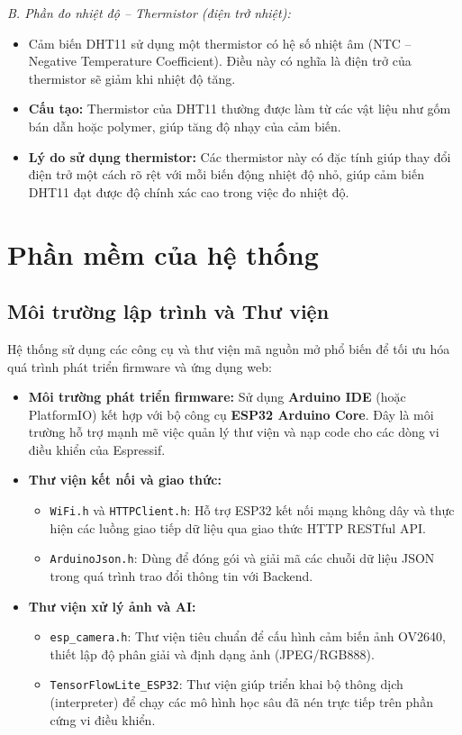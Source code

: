 \documentclass[12pt,a4paper]{report}
\begin{document}
\textit{B. Phần đo nhiệt độ -- Thermistor (điện trở nhiệt):}
\begin{itemize}
    \item Cảm biến DHT11 sử dụng một thermistor có hệ số nhiệt âm (NTC --
    Negative Temperature Coefficient). Điều này có nghĩa là điện trở của
    thermistor sẽ giảm khi nhiệt độ tăng.
    \item \textbf{Cấu tạo:} Thermistor của DHT11 thường được làm từ các vật liệu
    như gốm bán dẫn hoặc polymer, giúp tăng độ nhạy của cảm biến.
    \item \textbf{Lý do sử dụng thermistor:} Các thermistor này có đặc tính giúp
    thay đổi điện trở một cách rõ rệt với mỗi biến động nhiệt độ nhỏ, giúp cảm
    biến DHT11 đạt được độ chính xác cao trong việc đo nhiệt độ.
\end{itemize}

\section{Phần mềm của hệ thống}

\subsection{Môi trường lập trình và Thư viện}

Hệ thống sử dụng các công cụ và thư viện mã nguồn mở phổ biến để tối ưu hóa quá trình phát triển firmware và ứng dụng web:

\begin{itemize}
    \item \textbf{Môi trường phát triển firmware:} Sử dụng \textbf{Arduino IDE} (hoặc PlatformIO) kết hợp với bộ công cụ \textbf{ESP32 Arduino Core}. Đây là môi trường hỗ trợ mạnh mẽ việc quản lý thư viện và nạp code cho các dòng vi điều khiển của Espressif.
    \item \textbf{Thư viện kết nối và giao thức:}
    \begin{itemize}
        \item \texttt{WiFi.h} và \texttt{HTTPClient.h}: Hỗ trợ ESP32 kết nối mạng không dây và thực hiện các luồng giao tiếp dữ liệu qua giao thức HTTP RESTful API.
        \item \texttt{ArduinoJson.h}: Dùng để đóng gói và giải mã các chuỗi dữ liệu JSON trong quá trình trao đổi thông tin với Backend.
    \end{itemize}
    \item \textbf{Thư viện xử lý ảnh và AI:}
    \begin{itemize}
        \item \texttt{esp\_camera.h}: Thư viện tiêu chuẩn để cấu hình cảm biến ảnh OV2640, thiết lập độ phân giải và định dạng ảnh (JPEG/RGB888).
        \item \texttt{TensorFlowLite\_ESP32}: Thư viện giúp triển khai bộ thông dịch (interpreter) để chạy các mô hình học sâu đã nén trực tiếp trên phần cứng vi điều khiển.
    \end{itemize}
\end{itemize}
\end{document}
